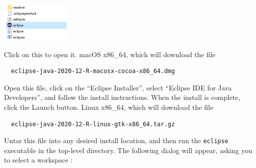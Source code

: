 \begin{center}
   \includegraphics[width=0.25\textwidth]{images/EclipseApp}
\end{center}

Click on this to open it. 
\fi
\ifMacOS
{\sf macOS x86\_64}, which will download the file
\begin{verbatim}
  eclipse-java-2020-12-R-macosx-cocoa-x86_64.dmg
\end{verbatim}
Open this file, click on the ``Eclipse Installer'',
select ``Eclipse IDE for Java Developers'', and follow
the install instructions. When the install is complete,
click the {\sf Launch} button.
\fi
\ifLinux
{\sf Linux x86\_64}, which will download the file
\begin{verbatim}
  eclipse-java-2020-12-R-linux-gtk-x86_64.tar.gz
\end{verbatim}
Untar this file into any desired install location,
and then run the {\tt eclipse} executable in the
top-level directory.
\fi
The following dialog will appear,
asking you to select a workspace \directory:

